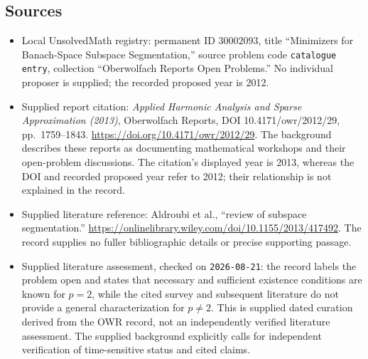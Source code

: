 \documentclass[11pt]{article}
\begin{document}
\subsection{Sources}
\begin{itemize}
\item Local UnsolvedMath registry: permanent ID \(30002093\), title ``Minimizers for Banach-Space Subspace Segmentation,'' source problem code \texttt{catalogue entry}, collection ``Oberwolfach Reports Open Problems.'' No individual proposer is supplied; the recorded proposed year is 2012.
\item Supplied report citation: \emph{Applied Harmonic Analysis and Sparse Approximation (2013)}, Oberwolfach Reports, DOI 10.4171/owr/2012/29, pp.~1759--1843. \url{https://doi.org/10.4171/owr/2012/29}. The background describes these reports as documenting mathematical workshops and their open-problem discussions. The citation's displayed year is 2013, whereas the DOI and recorded proposed year refer to 2012; their relationship is not explained in the record.
\item Supplied literature reference: Aldroubi et al., ``review of subspace segmentation.'' \url{https://onlinelibrary.wiley.com/doi/10.1155/2013/417492}. The record supplies no fuller bibliographic details or precise supporting passage.
\item Supplied literature assessment, checked on \texttt{2026-08-21}: the record labels the problem open and states that necessary and sufficient existence conditions are known for \(p=2\), while the cited survey and subsequent literature do not provide a general characterization for \(p\ne2\). This is supplied dated curation derived from the OWR record, not an independently verified literature assessment. The supplied background explicitly calls for independent verification of time-sensitive status and cited claims.
\end{itemize}
\end{document}
